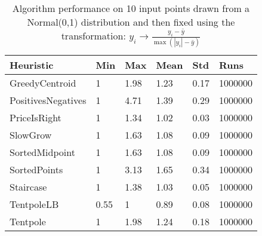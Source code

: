 \documentclass[11pt,twocolumn]{article}
\begin{document}
\begin{table*}
\begin{tabular}{|l|lllll|}
\hline
Heuristic & Min & Max & Mean & Std & Runs \\ \hline
GreedyCentroid& 1& 1.98& 1.23& 0.17& 1000000\\ 
PositivesNegatives& 1& 4.71& 1.39& 0.29& 1000000\\ 
PriceIsRight& 1& 1.34& 1.02& 0.03& 1000000\\ 
SlowGrow& 1& 1.63& 1.08& 0.09& 1000000\\ 
SortedMidpoint& 1& 1.63& 1.08& 0.09& 1000000\\ 
SortedPoints& 1& 3.13& 1.65& 0.34& 1000000\\ 
Staircase& 1& 1.38& 1.03& 0.05& 1000000\\ 
TentpoleLB& 0.55& 1& 0.89& 0.08& 1000000\\ 
Tentpole& 1& 1.98& 1.24& 0.18& 1000000\\ 
\hline
\end{tabular}
\caption{Algorithm performance on 10 input points drawn from a Normal(0,1) distribution and then fixed using the transformation: $y_i \rightarrow \frac{y_i - \bar{y} }{\max(|y_i| - \bar{y}) }$ }
\label{table:uniformResults}
\end{table*}
\end{document}
